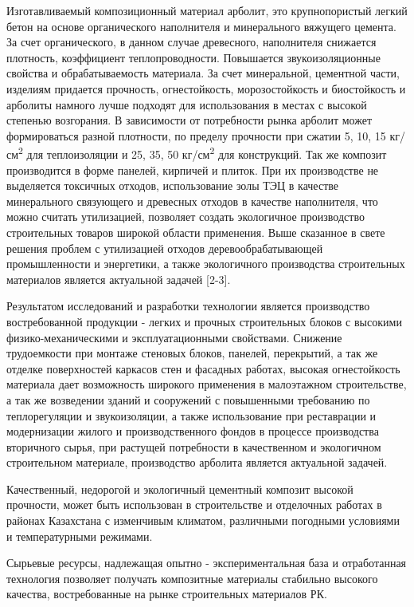 \begin{multicols}{2}
Изготавливаемый композиционный материал арболит, это крупнопористый
легкий бетон на основе органического наполнителя и минерального вяжущего
цемента. За счет органического, в данном случае древесного, наполнителя
снижается плотность, коэффициент теплопроводности. Повышается
звукоизоляционные свойства и обрабатываемость материала. За счет
минеральной, цементной части, изделиям придается прочность,
огнестойкость, морозостойкость и биостойкость и арболиты намного лучше
подходят для использования в местах с высокой степенью возгорания. В
зависимости от потребности рынка арболит может формироваться разной
плотности, по пределу прочности при сжатии 5, 10, 15
кг/см\textsuperscript{2} для теплоизоляции и 25, 35, 50
кг/см\textsuperscript{2} для конструкций. Так же композит производится в
форме панелей, кирпичей и плиток. При их производстве не выделяется
токсичных отходов, использование золы ТЭЦ в качестве минерального
связующего и древесных отходов в качестве наполнителя, что можно считать
утилизацией, позволяет создать экологичное производство строительных
товаров широкой области применения. Выше сказанное в свете решения
проблем с утилизацией отходов деревообрабатывающей промышленности и
энергетики, а также экологичного производства строительных материалов
является актуальной задачей {[}2-3{]}.

Результатом исследований и разработки технологии является производство
востребованной продукции - легких и прочных строительных блоков с
высокими физико-механическими и эксплуатационными свойствами. Снижение
трудоемкости при монтаже стеновых блоков, панелей, перекрытий, а так же
отделке поверхностей каркасов стен и фасадных работах, высокая
огнестойкость материала дает возможность широкого применения в
малоэтажном строительстве, а так же возведении зданий и сооружений с
повышенными требованию по теплорегуляции и звукоизоляции, а также
использование при реставрации и модернизации жилого и производственного
фондов в процессе производства вторичного сырья, при растущей
потребности в качественном и экологичном строительном материале,
производство арболита является актуальной задачей.

Качественный, недорогой и экологичный цементный композит высокой
прочности, может быть использован в строительстве и отделочных работах в
районах Казахстана с изменчивым климатом, различными погодными условиями
и температурными режимами.

Сырьевые ресурсы, надлежащая опытно - экспериментальная база и
отработанная технология позволяет получать композитные материалы
стабильно высокого качества, востребованные на рынке строительных
материалов РК.


\end{multicols}
